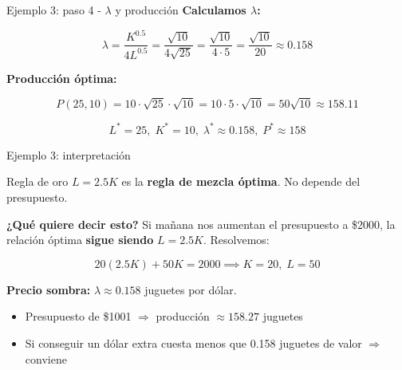 \documentclass{beamer}
\begin{document}
\begin{frame}{Ejemplo 3: paso 4 - $\lambda$ y producción}
    \small
    \textbf{Calculamos $\lambda$:}

    \[
    \lambda = \frac{K^{0.5}}{4 L^{0.5}} = \frac{\sqrt{10}}{4 \sqrt{25}} = \frac{\sqrt{10}}{4 \cdot 5} = \frac{\sqrt{10}}{20} \approx 0.158
    \]

    \vspace{0.5em}

    \textbf{Producción óptima:}

    \[
    P(25, 10) = 10 \cdot \sqrt{25} \cdot \sqrt{10} = 10 \cdot 5 \cdot \sqrt{10} = 50\sqrt{10} \approx 158.11
    \]

    \vspace{0.5em}

    \[
    \boxed{L^* = 25, \; K^* = 10, \; \lambda^* \approx 0.158, \; P^* \approx 158}
    \]
\end{frame}

\begin{frame}{Ejemplo 3: interpretación}
    \small
    \begin{alertblock}{Regla de oro}
        $L = 2.5 K$ es la \textbf{regla de mezcla óptima}. No depende del presupuesto.
    \end{alertblock}

    \vspace{0.5em}

    \textbf{¿Qué quiere decir esto?} Si mañana nos aumentan el presupuesto a \$2000, la relación óptima \textbf{sigue siendo} $L = 2.5K$. Resolvemos:

    \[
    20(2.5K) + 50K = 2000 \implies K = 20, \; L = 50
    \]

    \vspace{0.5em}

    \textbf{Precio sombra:} $\lambda \approx 0.158$ juguetes por dólar.
    \begin{itemize}
        \item Presupuesto de \$1001 $\Rightarrow$ producción $\approx 158.27$ juguetes
        \item Si conseguir un dólar extra cuesta menos que 0.158 juguetes de valor $\Rightarrow$ conviene
    \end{itemize}
\end{frame}
\end{document}

